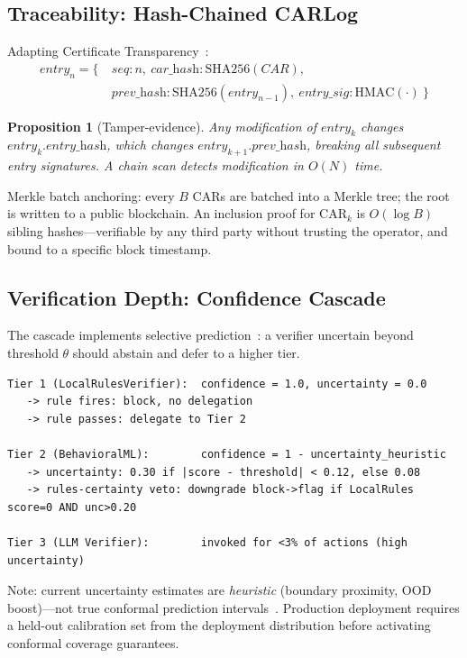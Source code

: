 \documentclass{article}
\newtheorem{proposition}{Proposition}
\begin{document}
\subsection{Traceability: Hash-Chained CARLog}
\label{sec:carlog}

Adapting Certificate Transparency~\cite{ct}:
\begin{align*}
\textit{entry}_n = \{\ &\textit{seq}: n,\ \textit{car\_hash}: \text{SHA256}(\textit{CAR}),\\
&\textit{prev\_hash}: \text{SHA256}(\textit{entry}_{n-1}),\ \textit{entry\_sig}: \text{HMAC}(\cdot)\ \}
\end{align*}

\begin{proposition}[Tamper-evidence]
Any modification of $\textit{entry}_k$ changes $\textit{entry}_k.\textit{entry\_hash}$, which changes $\textit{entry}_{k+1}.\textit{prev\_hash}$, breaking all subsequent entry signatures. A chain scan detects modification in $O(N)$ time.
\end{proposition}

Merkle batch anchoring: every $B$ CARs are batched into a Merkle tree; the root is written to a public blockchain. An inclusion proof for $\text{CAR}_k$ is $O(\log B)$ sibling hashes---verifiable by any third party without trusting the operator, and bound to a specific block timestamp.

\subsection{Verification Depth: Confidence Cascade}
\label{sec:cascade}

The cascade implements selective prediction~\cite{selective}: a verifier uncertain beyond threshold $\theta$ should abstain and defer to a higher tier.

\begin{lstlisting}
Tier 1 (LocalRulesVerifier):  confidence = 1.0, uncertainty = 0.0
   -> rule fires: block, no delegation
   -> rule passes: delegate to Tier 2

Tier 2 (BehavioralML):        confidence = 1 - uncertainty_heuristic
   -> uncertainty: 0.30 if |score - threshold| < 0.12, else 0.08
   -> rules-certainty veto: downgrade block->flag if LocalRules score=0 AND unc>0.20

Tier 3 (LLM Verifier):        invoked for <3% of actions (high uncertainty)
\end{lstlisting}

Note: current uncertainty estimates are \emph{heuristic} (boundary proximity, OOD boost)---not true conformal prediction intervals~\cite{conformal}. Production deployment requires a held-out calibration set from the deployment distribution before activating conformal coverage guarantees.
\end{document}
